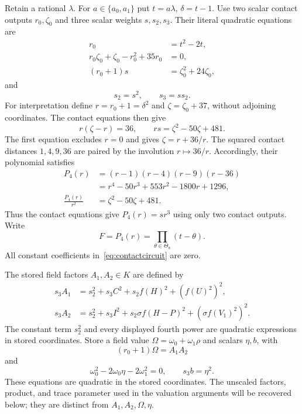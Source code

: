 \documentclass[11pt,a4paper]{article}
\begin{document}
Retain a rational $\lambda$. For $a\in\{a_0,a_1\}$ put $t=a\lambda$,
$\delta=t-1$. Use two scalar contact outputs $r_0,\zeta_0$ and
three scalar weights $s,s_2,s_3$. Their literal quadratic equations are
\begin{equation}\label{eq:contactcircuit}
\begin{split}
 r_0&=t^2-2t,\\
 r_0\zeta_0+\zeta_0-r_0^2+35r_0&=0,\\
 (r_0+1)s&=\zeta_0^2+24\zeta_0,
\end{split}
\end{equation}
and
\begin{equation}\label{eq:reciprocalweights}
                         s_2=s^2,\qquad s_3=ss_2.
\end{equation}
For interpretation define $r=r_0+1=\delta^2$ and
$\zeta=\zeta_0+37$, without adjoining coordinates. The contact
equations then give
\begin{equation}\label{eq:reciprocalcontact}
                  r(\zeta-r)=36,\qquad
                  rs=\zeta^2-50\zeta+481.
\end{equation}
The first equation excludes $r=0$ and gives $\zeta=r+36/r$.
The squared contact distances $1,4,9,36$ are paired by the involution
$r\mapsto36/r$. Accordingly, their polynomial satisfies
\begin{align}
 P_4(r)&=(r-1)(r-4)(r-9)(r-36)\nonumber\\
       &=r^4-50r^3+553r^2-1800r+1296,\label{eq:reciprocalpolynomial}\\
 \frac{P_4(r)}{r^2}&=\zeta^2-50\zeta+481.\nonumber
\end{align}
Thus the contact equations give $P_4(r)=sr^3$ using only two contact
outputs. Write
\[
                     F=P_4(r)=\prod_{\theta\in\Theta_8}(t-\theta).
\]
All constant coefficients in~\eqref{eq:contactcircuit} are zero.

The stored field factors $A_1,A_2\in K$ are defined by
\begin{equation}\label{eq:clearedfactors}
\begin{split}
 s_3A_1&=s_2^2+s_3C^2+s_2f(H)^2+(f(U)^2)^2,\\
 s_3A_2&=s_2^2+s_3I^2+s_2\sigma f(H-P)^2+(\sigma f(V_1)^2)^2.
\end{split}
\end{equation}
The constant term $s_2^2$ and every displayed fourth power are
quadratic expressions in stored coordinates. Store a field value
$\Omega=\omega_0+\omega_1\rho$ and scalars $\eta,b$, with
\begin{equation}\label{eq:normalizedproduct}
                         (r_0+1)\Omega=A_1A_2
\end{equation}
and
\begin{equation}\label{eq:scaledtrace}
 \omega_0^2-2\omega_0\eta-2\omega_1^2=0,
 \qquad s_3b=\eta^2.
\end{equation}
These equations are quadratic in the stored coordinates. The
unscaled factors, product, and trace parameter used in the valuation
arguments will be recovered below; they are distinct from
$A_1,A_2,\Omega,\eta$.
\end{document}
